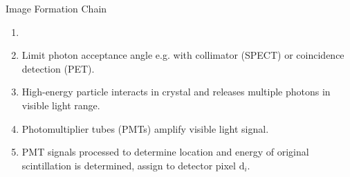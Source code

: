 \begin{frame}[c]{Image Formation Chain}
    \begin{enumerate}
        \setlength\itemsep{0.3cm}
        \item \textbf{\large \color{faublue}{Photon emission}}

        \item \textbf{\large \color{faublue}{Projection}}

              Limit photon acceptance angle e.g. with collimator (SPECT) or coincidence detection (PET).

        \item \textbf{\large \color{faublue}{Scintillation}}

              High-energy particle interacts in crystal and releases multiple photons in visible light range.

        \item \textbf{\large \color{faublue}{Amplification}}

              Photomultiplier tubes (PMTs) amplify visible light signal.

        \item \textbf{\large \color{faublue}{Signal Processing}}

              PMT signals processed to determine location and energy of original scintillation is determined, assign to detector pixel $\text{d}_{i}$.
    \end{enumerate}
\end{frame}


